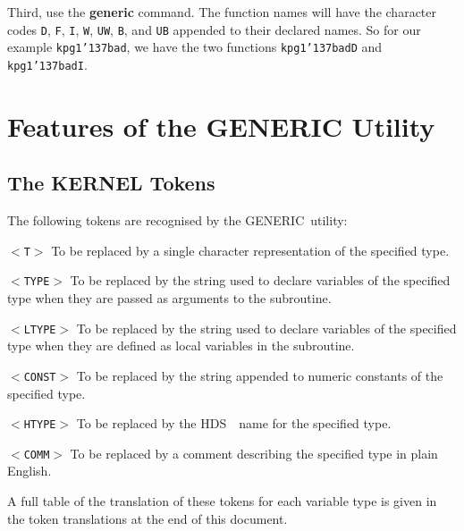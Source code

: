 \documentclass[twoside,11pt]{article}
\renewcommand{\_}{{\tt\char'137}}     %
\newcommand{\htmlref}[2]{#1}
\newcommand{\xref}[3]{#1}
\newcommand{\GENERIC}{{\footnotesize GENERIC}\normalsize}
\newcommand{\HDS}{{\footnotesize HDS}\normalsize}
\newcommand{\HDSref}{\xref{\HDS}{sun92}{}~}
\newcommand{\latexelsehtml}[2]{#1}
\renewcommand{\latexelsehtml}[2]{#2}
\begin{document}
Third, use the {\bf generic} command.  The function names will
have the character codes {\tt D}, {\tt F}, {\tt I}, {\tt W}, {\tt UW}, 
{\tt B}, and {\tt UB} appended to their declared names.  So
for our example {\tt kpg1\_bad}, we have the two functions
{\tt kpg1\_badD} and {\tt kpg1\_badI}.


\section{Features of the GENERIC Utility}

\subsection{The KERNEL Tokens}

The following tokens are recognised by the \GENERIC\ utility:

\newlength{\numlen}
\settowidth{\numlen}{000000000000}
\settowidth{\labelsep}{000}

\begin{list}{}{\setlength{\labelwidth}{\numlen}\setlength{\leftmargin}{\numlen}
\addtolength{\leftmargin}{\labelsep}}

\item[{\tt $<$T$>$}] To be replaced by a single character representation
of the specified type.

\item[{\tt $<$TYPE$>$}] To be replaced by the string used to declare variables
of the specified type when they are passed as arguments to
the subroutine.

\item[{\tt $<$LTYPE$>$}] To be replaced by the string used to declare variables
of the specified type when they are defined as local variables
in the subroutine.

\item[{\tt $<$CONST$>$}] To be replaced by the string appended to numeric 
constants of the specified type.

\item[{\tt $<$HTYPE$>$}] To be replaced by the \HDSref\ name for the specified 
type.

\item[{\tt $<$COMM$>$}] To be replaced by a comment describing the specified type
in plain English.

\end{list}

A full table of the translation of these tokens for each variable type
is given in 
\latexelsehtml{Appendix~\ref{ap_a}}{the
\htmlref{token translations}{ap_a}}
at the end of this document. 
\end{document}
